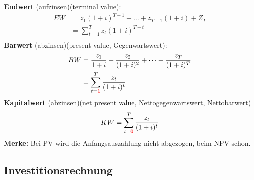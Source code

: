 \documentclass[a4paper]{scrartcl}
\begin{document}
\begin{multicols}{3}
\textbf{Endwert} (aufzinsen)(terminal value):
\begin{equation*}
\begin{split}
EW &= z_1(1+i)^{T-1} + \dots + z_{T-1}(1+i) + Z_T \\
   &= \sum^T_{t=1} z_t (1+i)^{T-t}\\
\end{split}
\end{equation*}
\textbf{Barwert} (abzinsen)(present value, Gegenwartswert):
\begin{equation*}
\begin{split}
BW &= \frac{z_1}{1+i}+\frac{z_2}{(1+i)^2}+\dots+\frac{z_T}{(1+i)^T}\\
     &= \sum^T_{t=\color{red}{\textbf{1}}}\frac{z_t}{(1+i)^t}\\
\end{split}
\end{equation*}
\textbf{Kapitalwert} (abzinsen)(net present value‚ Nettogegenwartswert, Nettobarwert)
$$KW = \sum^T_{t=\color{red}{\textbf{0}}}\frac{z_t}{(1+i)^t}$$
\textbf{Merke:} Bei PV wird die Anfangsauszahlung nicht abgezogen, beim NPV schon.

\subsection{Investitionsrechnung}


\end{multicols}
\end{document}
